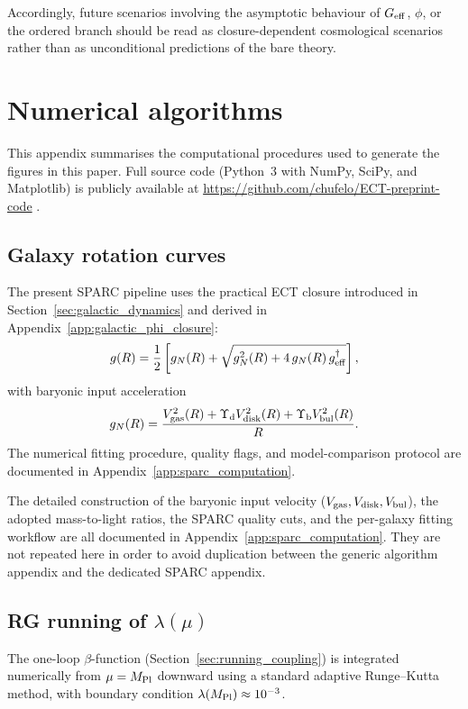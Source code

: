 \documentclass[11pt,a4paper]{article}
\numberwithin{equation}{section}
\begin{document}
Accordingly, future scenarios involving the asymptotic behaviour of
$G_{\rm eff}$, $\phi$, or the ordered branch should be read as
closure-dependent cosmological scenarios rather than as unconditional
predictions of the bare theory.



\section{Numerical algorithms}
\label{app:algorithms}

This appendix summarises the computational procedures used to generate
the figures in this paper.  Full source code (Python~3 with NumPy,
SciPy, and Matplotlib) is publicly available at
\url{https://github.com/chufelo/ECT-preprint-code} .

\subsection{Galaxy rotation curves}

The present SPARC pipeline uses the practical ECT closure introduced in
Section~\ref{sec:galactic_dynamics} and derived in
Appendix~\ref{app:galactic_phi_closure}:
\begin{equation}
g(R)=\frac{1}{2}\left[g_N(R)+\sqrt{g_N^2(R)+4\,g_N(R)\,g^\dagger_{\rm eff}}\right],
\end{equation}
with baryonic input acceleration
\begin{equation}
g_N(R)=
\frac{V_{\rm gas}^2(R)+\Upsilon_{\rm d}V_{\rm disk}^2(R)+
\Upsilon_{\rm b}V_{\rm bul}^2(R)}{R}.
\end{equation}
The numerical fitting procedure, quality flags, and model-comparison
protocol are documented in Appendix~\ref{app:sparc_computation}.

The detailed construction of the baryonic input velocity
($V_{\rm gas},V_{\rm disk},V_{\rm bul}$), the adopted
mass-to-light ratios, the SPARC quality cuts, and the
per-galaxy fitting workflow are all documented in
Appendix~\ref{app:sparc_computation}.  They are not repeated
here in order to avoid duplication between the generic
algorithm appendix and the dedicated SPARC appendix.

\subsection{RG running of $\lambda(\mu)$}

The one-loop $\beta$-function (Section~\ref{sec:running_coupling})
is integrated numerically from $\mu = M_{\rm Pl}$ downward using a
standard adaptive Runge--Kutta method, with boundary condition
$\lambda(M_{\rm Pl}) \approx 10^{-3}$.
\end{document}
